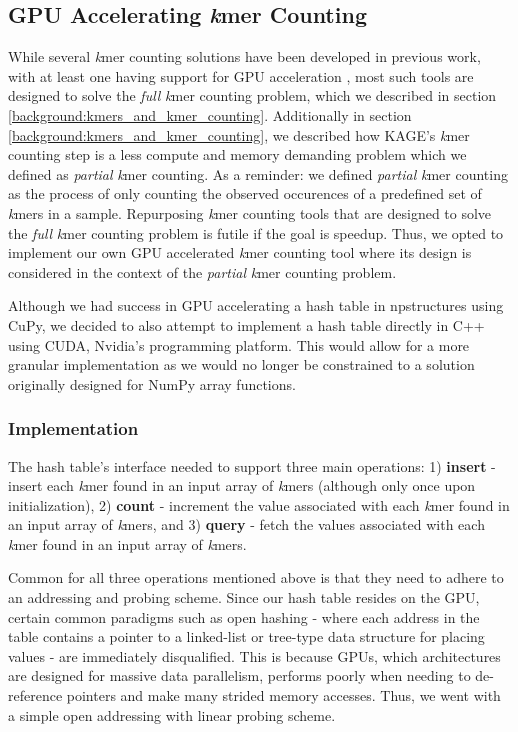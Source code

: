 \subsection{GPU Accelerating \textit{k}mer Counting} \label{methods:gpu_accelerating_kmer_counting}
While several \textit{k}mer counting solutions have been developed in previous work, with at least one having support for GPU acceleration \cite{kmer_counting_tools}, most such tools are designed to solve the \textit{full} \textit{k}mer counting problem, which we described in section \ref{background:kmers_and_kmer_counting}.
Additionally in section \ref{background:kmers_and_kmer_counting}, we described how KAGE's \textit{k}mer counting step is a less compute and memory demanding problem which we defined as \textit{partial} \textit{k}mer counting.
As a reminder: we defined \textit{partial} \textit{k}mer counting as the process of only counting the observed occurences of a predefined set of \textit{k}mers in a sample.
Repurposing \textit{k}mer counting tools that are designed to solve the \textit{full} \textit{k}mer counting problem is futile if the goal is speedup.
Thus, we opted to implement our own GPU accelerated \textit{k}mer counting tool where its design is considered in the context of the \textit{partial} \textit{k}mer counting problem.

Although we had success in GPU accelerating a hash table in npstructures using CuPy, we decided to also attempt to implement a hash table directly in C++ using CUDA, Nvidia's programming platform.
This would allow for a more granular implementation as we would no longer be constrained to a solution originally designed for NumPy array functions.

\subsubsection{Implementation}
The hash table's interface needed to support three main operations: 1) \textbf{insert} - insert each \textit{k}mer found in an input array of \textit{k}mers (although only once upon initialization), 2) \textbf{count} - increment the value associated with each \textit{k}mer found in an input array of \textit{k}mers, and 3) \textbf{query} - fetch the values associated with each \textit{k}mer found in an input array of \textit{k}mers.

Common for all three operations mentioned above is that they need to adhere to an addressing and probing scheme.
Since our hash table resides on the GPU, certain common paradigms such as open hashing - where each address in the table contains a pointer to a linked-list or tree-type data structure for placing values - are immediately disqualified.
This is because GPUs, which architectures are designed for massive data parallelism, performs poorly when needing to de-reference pointers and make many strided memory accesses.
Thus, we went with a simple open addressing with linear probing scheme. 

